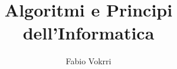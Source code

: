 \title{\Huge \textbf{Algoritmi e Principi dell'Informatica}}
\author{\huge Fabio Vokrri}

\begin{titlepage}
  \maketitle
\end{titlepage}